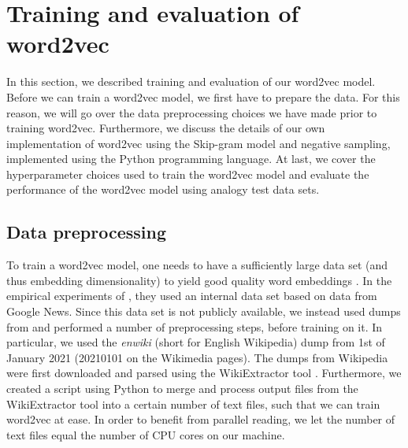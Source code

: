 \section{Training and evaluation of word2vec}
\label{sec:training-and-eval-our-word2vec-impl}
In this section, we described training and evaluation of our word2vec model. Before we can train a word2vec model, we first have to prepare the data. For this reason, we will go over the data preprocessing choices we have made prior to training word2vec. Furthermore, we discuss the details of our own implementation of word2vec using the Skip-gram model and negative sampling, implemented using the Python programming language. At last, we cover the hyperparameter choices used to train the word2vec model and evaluate the performance of the word2vec model using analogy test data sets.

\subsection{Data preprocessing}
\label{sec:word2vec-data-preprocessing}
To train a word2vec model, one needs to have a sufficiently large data set (and thus embedding dimensionality) to yield good quality word embeddings \cite{mikolov2013b}. In the empirical experiments of \cite{mikolov2013b}, they used an internal data set based on data from Google News. Since this data set is not publicly available, we instead used dumps from \cite{WikimediaDumps} and performed a number of preprocessing steps, before training on it. In particular, we used the \textit{enwiki} (short for English Wikipedia) dump from 1st of January 2021 (20210101 on the Wikimedia pages). The dumps from Wikipedia were first downloaded and parsed using the WikiExtractor tool \cite{Wikiextractor2015}. Furthermore, we created a script using Python to merge and process output files from the WikiExtractor tool into a certain number of text files, such that we can train word2vec at ease. In order to benefit from parallel reading, we let the number of text files equal the number of CPU cores on our machine.

